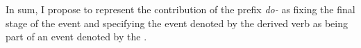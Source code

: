 In sum, I propose to represent the contribution of the prefix \textit{do-} as fixing the final stage of the event and specifying the event denoted by the derived verb as being part of an event denoted by the .


%



